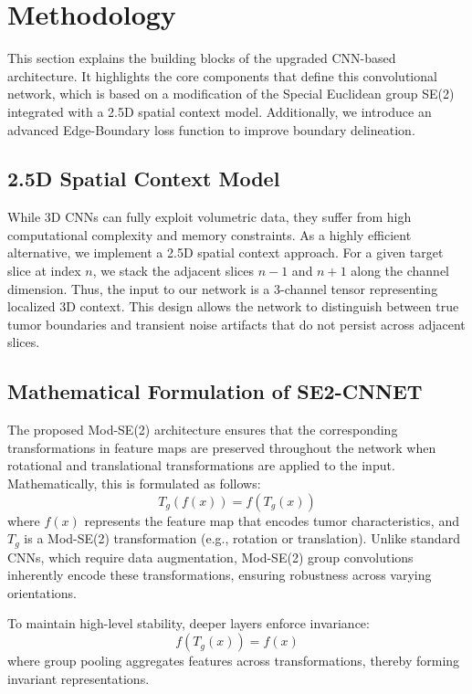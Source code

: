 \section{Methodology}
This section explains the building blocks of the upgraded CNN-based architecture. It highlights the core components that define this convolutional network, which is based on a modification of the Special Euclidean group SE(2) integrated with a 2.5D spatial context model. Additionally, we introduce an advanced Edge-Boundary loss function to improve boundary delineation.

\subsection{2.5D Spatial Context Model}
While 3D CNNs can fully exploit volumetric data, they suffer from high computational complexity and memory constraints. As a highly efficient alternative, we implement a 2.5D spatial context approach. For a given target slice at index $n$, we stack the adjacent slices $n-1$ and $n+1$ along the channel dimension. Thus, the input to our network is a 3-channel tensor representing localized 3D context. This design allows the network to distinguish between true tumor boundaries and transient noise artifacts that do not persist across adjacent slices.

\subsection{Mathematical Formulation of SE2-CNNET}
The proposed Mod-SE(2) architecture ensures that the corresponding transformations in feature maps are preserved throughout the network when rotational and translational transformations are applied to the input. Mathematically, this is formulated as follows:
\begin{equation}
    T_g(f(x)) = f(T_g(x))
\end{equation}
where $f(x)$ represents the feature map that encodes tumor characteristics, and $T_g$ is a Mod-SE(2) transformation (e.g., rotation or translation). Unlike standard CNNs, which require data augmentation, Mod-SE(2) group convolutions inherently encode these transformations, ensuring robustness across varying orientations.

To maintain high-level stability, deeper layers enforce invariance:
\begin{equation}
    f(T_g(x)) = f(x)
\end{equation}
where group pooling aggregates features across transformations, thereby forming invariant representations. 

